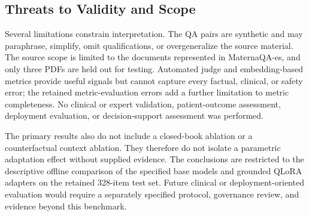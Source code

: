 \subsection{Threats to Validity and Scope}

Several limitations constrain interpretation. The QA pairs are synthetic and may paraphrase, simplify, omit qualifications, or overgeneralize the source material. The source scope is limited to the documents represented in MaternaQA-es, and only three PDFs are held out for testing. Automated judge and embedding-based metrics provide useful signals but cannot capture every factual, clinical, or safety error; the retained metric-evaluation errors add a further limitation to metric completeness. No clinical or expert validation, patient-outcome assessment, deployment evaluation, or decision-support assessment was performed.

The primary results also do not include a closed-book ablation or a counterfactual context ablation. They therefore do not isolate a parametric adaptation effect without supplied evidence. The conclusions are restricted to the descriptive offline comparison of the specified base models and grounded QLoRA adapters on the retained 328-item test set. Future clinical or deployment-oriented evaluation would require a separately specified protocol, governance review, and evidence beyond this benchmark.
